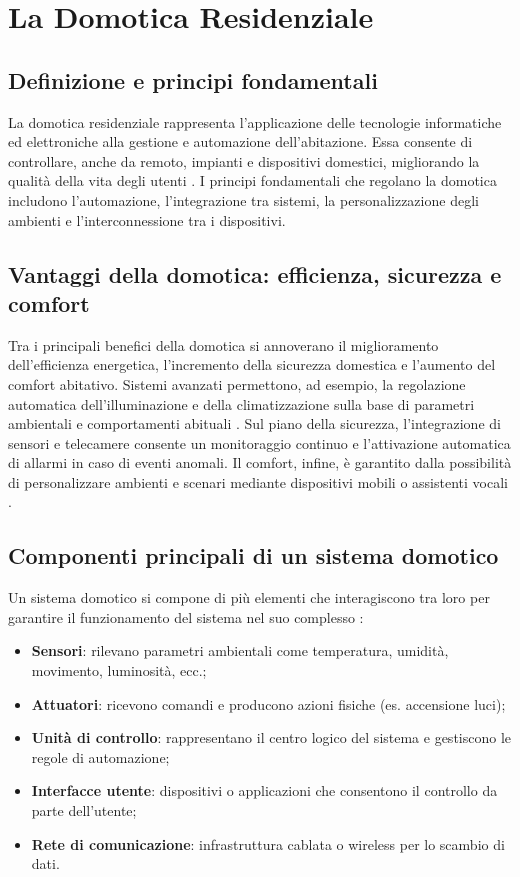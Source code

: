\chapter{La Domotica Residenziale}
\section{Definizione e principi fondamentali}
La domotica residenziale rappresenta l'applicazione delle tecnologie informatiche ed elettroniche alla gestione e automazione dell'abitazione. Essa consente di controllare, anche da remoto, impianti e dispositivi domestici, migliorando la qualità della vita degli utenti \parencite{domoticaWiki}. I principi fondamentali che regolano la domotica includono l'automazione, l'integrazione tra sistemi, la personalizzazione degli ambienti e l'interconnessione tra i dispositivi.

\section{Vantaggi della domotica: efficienza, sicurezza e comfort}
Tra i principali benefici della domotica si annoverano il miglioramento dell'efficienza energetica, l'incremento della sicurezza domestica e l'aumento del comfort abitativo. Sistemi avanzati permettono, ad esempio, la regolazione automatica dell'illuminazione e della climatizzazione sulla base di parametri ambientali e comportamenti abituali \parencite{iecSmartHome}. Sul piano della sicurezza, l'integrazione di sensori e telecamere consente un monitoraggio continuo e l'attivazione automatica di allarmi in caso di eventi anomali. Il comfort, infine, è garantito dalla possibilità di personalizzare ambienti e scenari mediante dispositivi mobili o assistenti vocali \parencite{domoticaWiki}.

\section{Componenti principali di un sistema domotico}
Un sistema domotico si compone di più elementi che interagiscono tra loro per garantire il funzionamento del sistema nel suo complesso \parencite{iecSmartHome}:
\begin{itemize}
    \item \textbf{Sensori}: rilevano parametri ambientali come temperatura, umidità, movimento, luminosità, ecc.;
    \item \textbf{Attuatori}: ricevono comandi e producono azioni fisiche (es. accensione luci);
    \item \textbf{Unità di controllo}: rappresentano il centro logico del sistema e gestiscono le regole di automazione;
    \item \textbf{Interfacce utente}: dispositivi o applicazioni che consentono il controllo da parte dell'utente;
    \item \textbf{Rete di comunicazione}: infrastruttura cablata o wireless per lo scambio di dati.
\end{itemize}


